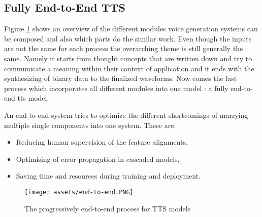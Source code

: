 \subsection{Fully End-to-End TTS}

Figure \ref{fig:end-to-end} shows an overview of the different modules voice generation systems can be composed and also which parts do the similar work. Even though the inputs are not the same for each process the overarching theme is still generally the same. Namely it starts from thought concepts that are written down and try to communicate a meaning within their context of application and it ends with the synthesizing of binary data to the finalized waveforms.
Now comes the last process which incorporates all different modules into one model : a fully end-to-end \gls{tts} model.

An end-to-end system tries to optimize the different shortcomings of marrying multiple single components into one system. These are:
\begin{itemize}
    \item Reducing human supervision of the feature alignments,
    \item Optimising of error propagation in cascaded models,
    \item Saving time and resources during training and deployment.
\end{itemize}
\cite{Tan2023fullyendtoend}

 \begin{figure}[H]
    \centering
    \texttt{[image: assets/end-to-end.PNG]}
    \caption{The progressively end-to-end process for TTS models \cite{Tan2023fullyendtoend}}
    \label{fig:end-to-end}
\end{figure}

